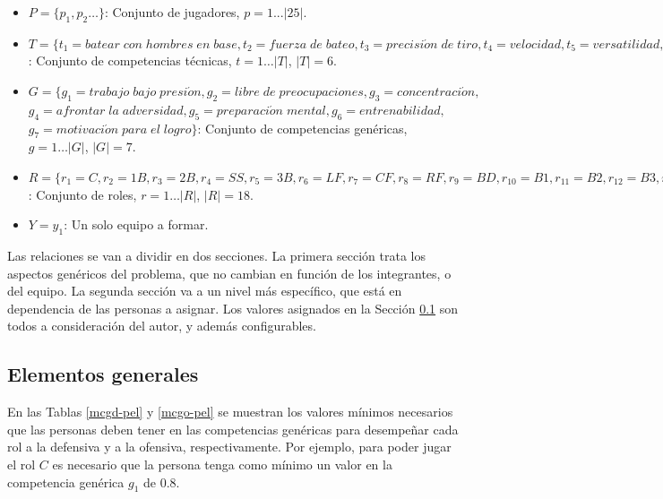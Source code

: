\begin{itemize}	
	\item $P=\{p_1, p_2\ldots\}$: Conjunto de jugadores, $p = 1...|25|$.
	
	\item $T=\{t_1=batear\;con\;hombres\;en\;base, t_2=fuerza\;de\;bateo, t_3=precisi\acute{o}n\;de\;tiro, t_4=velocidad, t_5=versatilidad, t_6=capacidad\;de\;embase\}$: Conjunto de competencias técnicas, $t= 1\ldots|T|$, $|T|=6$. \label{compt-pel}
	
	\item $G=\{g_1=trabajo\;bajo\;presi\acute{o}n
	, g_2=libre\;de\;preocupaciones, g_3=concentraci\acute{o}n,$ $g_4=afrontar\;la\;adversidad, g_5=preparaci\acute{o}n\;mental, g_6=entrenabilidad,$ $g_7=motivaci\acute{o}n\;para\;el\;logro\}$: Conjunto de competencias genéricas, $g= 1\ldots |G|$, $|G|=7$.
	
	\item $R=\{r_1=C,r_2=1B,r_3=2B,r_4=SS,r_5=3B,r_6=LF,r_7=CF,r_8=RF,r_{9}=BD,r_{10}=B1,r_{11}=B2,r_{12}=B3,r_{13}=B4,r_{14}=B5,r_{15}=B6, r_{16}=B7,r_{17}=B8,r_{18}=B9\}$: Conjunto de roles, $r = 1\ldots |R|$, $|R|=18$. \label{def-roles-pel} 
	
	\item $Y={y_1}$: Un solo equipo a formar.
	
\end{itemize}


Las relaciones se van a dividir en dos secciones. La primera sección trata los aspectos genéricos del problema, que no cambian en función de los integrantes, o del equipo. La segunda sección va a un nivel más específico, que está en dependencia de las personas a asignar. Los valores asignados en la Sección \ref{asp-gen-pel} son todos a consideración del autor, y además configurables.

\subsection{Elementos generales} \label{asp-gen-pel}

En las Tablas \ref{mcgd-pel} y \ref{mcgo-pel} se muestran los valores mínimos necesarios que las personas deben tener en las competencias genéricas para desempeñar cada rol a la defensiva y a la ofensiva, respectivamente. Por ejemplo, para poder jugar el rol $C$ es necesario que la persona tenga como mínimo un valor en la competencia genérica $g_1$ de 0.8. 

